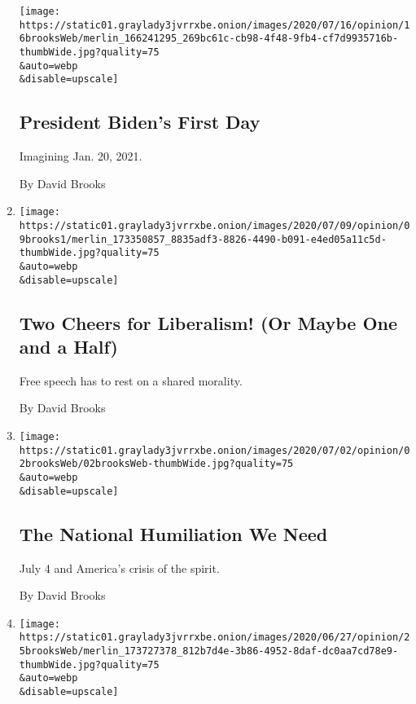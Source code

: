 \begin{enumerate}
  \texttt{[image: https://static01.graylady3jvrrxbe.onion/images/2020/07/16/opinion/16brooksWeb/merlin\_166241295\_269bc61c-cb98-4f48-9fb4-cf7d9935716b-thumbWide.jpg?quality=75\\\&auto=webp\\\&disable=upscale]}

  \hypertarget{president-bidens-first-day}{%
  \subsection{President Biden's First
  Day}\label{president-bidens-first-day}}

  Imagining Jan. 20, 2021.

  By David Brooks
\item
  \href{/2020/07/09/opinion/liberalism-morality.html}{}

  \texttt{[image: https://static01.graylady3jvrrxbe.onion/images/2020/07/09/opinion/09brooks1/merlin\_173350857\_8835adf3-8826-4490-b091-e4ed05a11c5d-thumbWide.jpg?quality=75\\\&auto=webp\\\&disable=upscale]}

  \hypertarget{two-cheers-for-liberalism-or-maybe-one-and-a-half}{%
  \subsection{Two Cheers for Liberalism! (Or Maybe One and a
  Half)}\label{two-cheers-for-liberalism-or-maybe-one-and-a-half}}

  Free speech has to rest on a shared morality.

  By David Brooks
\item
  \href{/2020/07/02/opinion/coronavirus-july-4.html}{}

  \texttt{[image: https://static01.graylady3jvrrxbe.onion/images/2020/07/02/opinion/02brooksWeb/02brooksWeb-thumbWide.jpg?quality=75\\\&auto=webp\\\&disable=upscale]}

  \hypertarget{the-national-humiliation-we-need}{%
  \subsection{The National Humiliation We
  Need}\label{the-national-humiliation-we-need}}

  July 4 and America's crisis of the spirit.

  By David Brooks
\item
  \href{/2020/06/25/opinion/us-coronavirus-protests.html}{}

  \texttt{[image: https://static01.graylady3jvrrxbe.onion/images/2020/06/27/opinion/25brooksWeb/merlin\_173727378\_812b7d4e-3b86-4952-8daf-dc0aa7cd78e9-thumbWide.jpg?quality=75\\\&auto=webp\\\&disable=upscale]}


\end{enumerate}
